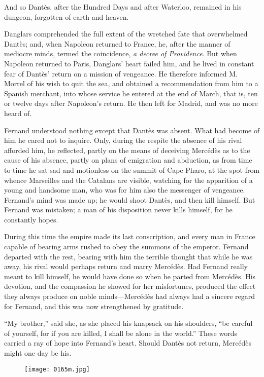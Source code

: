 And so Dantès, after the Hundred Days and after Waterloo, remained in
his dungeon, forgotten of earth and heaven.

Danglars comprehended the full extent of the wretched fate that
overwhelmed Dantès; and, when Napoleon returned to France, he, after
the manner of mediocre minds, termed the coincidence, \textit{a decree of
Providence}. But when Napoleon returned to Paris, Danglars’ heart
failed him, and he lived in constant fear of Dantès’ return on a
mission of vengeance. He therefore informed M. Morrel of his wish to
quit the sea, and obtained a recommendation from him to a Spanish
merchant, into whose service he entered at the end of March, that is,
ten or twelve days after Napoleon’s return. He then left for Madrid,
and was no more heard of.

Fernand understood nothing except that Dantès was absent. What had
become of him he cared not to inquire. Only, during the respite the
absence of his rival afforded him, he reflected, partly on the means of
deceiving Mercédès as to the cause of his absence, partly on plans of
emigration and abduction, as from time to time he sat sad and
motionless on the summit of Cape Pharo, at the spot from whence
Marseilles and the Catalans are visible, watching for the apparition of
a young and handsome man, who was for him also the messenger of
vengeance. Fernand’s mind was made up; he would shoot Dantès, and then
kill himself. But Fernand was mistaken; a man of his disposition never
kills himself, for he constantly hopes.

During this time the empire made its last conscription, and every man
in France capable of bearing arms rushed to obey the summons of the
emperor. Fernand departed with the rest, bearing with him the terrible
thought that while he was away, his rival would perhaps return and
marry Mercédès. Had Fernand really meant to kill himself, he would have
done so when he parted from Mercédès. His devotion, and the compassion
he showed for her misfortunes, produced the effect they always produce
on noble minds—Mercédès had always had a sincere regard for Fernand,
and this was now strengthened by gratitude.

“My brother,” said she, as she placed his knapsack on his shoulders,
“be careful of yourself, for if you are killed, I shall be alone in the
world.” These words carried a ray of hope into Fernand’s heart. Should
Dantès not return, Mercédès might one day be his.

\begin{figure}[h]
\texttt{[image: 0165m.jpg]}
\end{figure}

